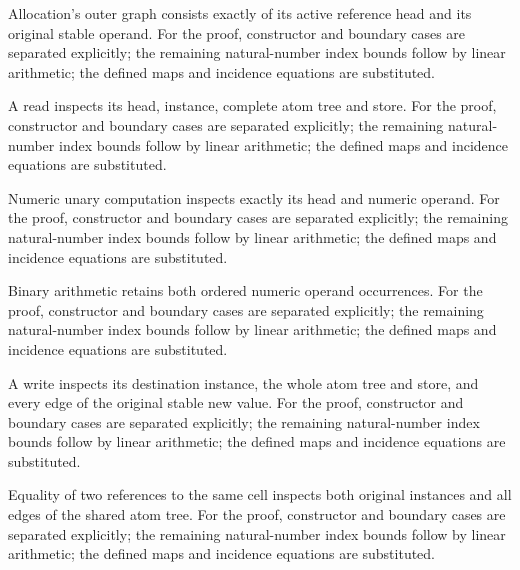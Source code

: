 Allocation's outer graph consists exactly of its active reference head and its original stable operand.
For the proof, constructor and boundary cases are separated explicitly; the remaining natural-number index bounds follow by linear arithmetic; the defined maps and incidence equations are substituted.
\par{}

A read inspects its head, instance, complete atom tree and store.
For the proof, constructor and boundary cases are separated explicitly; the remaining natural-number index bounds follow by linear arithmetic; the defined maps and incidence equations are substituted.
\par{}

Numeric unary computation inspects exactly its head and numeric operand.
For the proof, constructor and boundary cases are separated explicitly; the remaining natural-number index bounds follow by linear arithmetic; the defined maps and incidence equations are substituted.
\par{}

Binary arithmetic retains both ordered numeric operand occurrences.
For the proof, constructor and boundary cases are separated explicitly; the remaining natural-number index bounds follow by linear arithmetic; the defined maps and incidence equations are substituted.
\par{}

A write inspects its destination instance, the whole atom tree and store, and every edge of the original stable new value.
For the proof, constructor and boundary cases are separated explicitly; the remaining natural-number index bounds follow by linear arithmetic; the defined maps and incidence equations are substituted.
\par{}

Equality of two references to the same cell inspects both original instances and all edges of the shared atom tree.
For the proof, constructor and boundary cases are separated explicitly; the remaining natural-number index bounds follow by linear arithmetic; the defined maps and incidence equations are substituted.
\par{}

